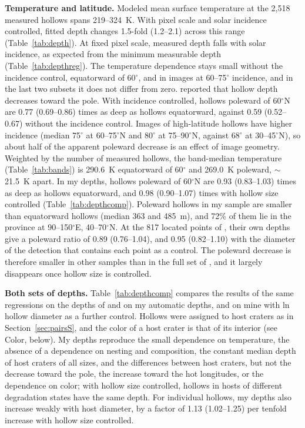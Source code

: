 \documentclass{planetary}
\begin{document}
\textbf{Temperature and latitude.} Modeled mean surface temperature at the 2,518 measured hollows spans 219--324~K. With pixel scale and solar incidence controlled, fitted depth changes 1.5-fold (1.2--2.1) across this range (Table~\ref{tab:depth}). At fixed pixel scale, measured depth falls with solar incidence, as expected from the minimum measurable depth (Table~\ref{tab:depthreg}). The temperature dependence stays small without the incidence control, equatorward of 60$^\circ$, and in images at 60--75$^\circ$ incidence, and in the last two subsets it does not differ from zero. \textcite{phillips2021} reported that hollow depth decreases toward the pole. With incidence controlled, hollows poleward of 60$^\circ$N are 0.77 (0.69--0.86) times as deep as hollows equatorward, against 0.59 (0.52--0.67) without the incidence control. Images of high-latitude hollows have higher incidence (median 75$^\circ$ at 60--75$^\circ$N and 80$^\circ$ at 75--90$^\circ$N, against 68$^\circ$ at 30--45$^\circ$N), so about half of the apparent poleward decrease is an effect of image geometry. Weighted by the number of measured hollows, the band-median temperature (Table~\ref{tab:bands}) is 290.6~K equatorward of 60$^\circ$ and 269.0~K poleward, $\sim$21.5~K apart. In my depths, hollows poleward of 60$^\circ$N are 0.93 (0.83--1.03) times as deep as hollows equatorward, and 0.98 (0.90--1.07) times with hollow size controlled (Table~\ref{tab:depthcomp}). Poleward hollows in my sample are smaller than equatorward hollows (median 363 and 485~m), and 72\% of them lie in the province at 90--150$^\circ$E, 40--70$^\circ$N. At the 817 located points of \textcite{blewett2016}, their own depths give a poleward ratio of 0.89 (0.76--1.04), and 0.95 (0.82--1.10) with the diameter of the detection that contains each point as a control. The poleward decrease is therefore smaller in other samples than in the full set of \textcite{blewett2016}, and it largely disappears once hollow size is controlled.

\textbf{Both sets of depths.} Table~\ref{tab:depthcomp} compares the results of the same regressions on the depths of \textcite{blewett2016} and on my automatic depths, and on mine with ln hollow diameter as a further control. Hollows were assigned to host craters as in Section~\ref{sec:pairsS}, and the color of a host crater is that of its interior (see Color, below). My depths reproduce the small dependence on temperature, the absence of a dependence on nesting and composition, the constant median depth of host craters of all sizes, and the differences between host craters, but not the decrease toward the pole, the increase toward the hot longitudes, or the dependence on color; with hollow size controlled, hollows in hosts of different degradation states have the same depth. For individual hollows, my depths also increase weakly with host diameter, by a factor of 1.13 (1.02--1.25) per tenfold increase with hollow size controlled.
\end{document}
